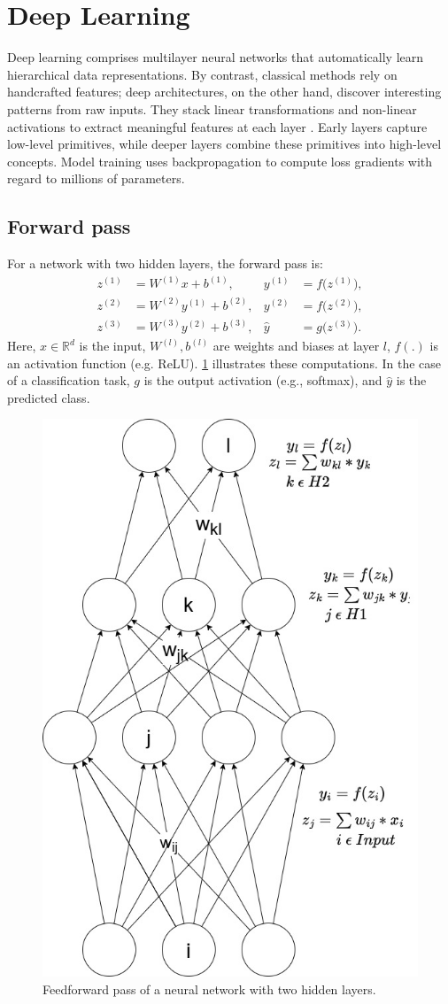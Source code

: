\section{Deep Learning} 
\label{sec:deep_learning}

Deep learning comprises multilayer neural networks that automatically learn hierarchical data representations. By contrast, classical methods rely on handcrafted features; deep architectures, on the other hand, discover interesting patterns from raw inputs. They stack linear transformations and non-linear activations to extract meaningful features at each layer \cite{lecun_deep_learning_2015}. Early layers capture low-level primitives, while deeper layers combine these primitives into high-level concepts. Model training uses backpropagation to compute loss gradients with regard to millions of parameters. 

\subsection{Forward pass}
For a network with two hidden layers, the forward pass is:
\begin{align}
z^{(1)} &= W^{(1)} x + b^{(1)}, & y^{(1)} &= f\bigl(z^{(1)}\bigr), \\
z^{(2)} &= W^{(2)} y^{(1)} + b^{(2)}, & y^{(2)} &= f\bigl(z^{(2)}\bigr), \\
z^{(3)} &= W^{(3)} y^{(2)} + b^{(3)}, & \hat{y} &= g\bigl(z^{(3)}\bigr).
\end{align}
Here, \(x\in\mathbb{R}^d\) is the input, \(W^{(l)},b^{(l)}\) are weights and biases at layer \(l\), \(f(.)\) is an activation function (e.g. ReLU). \cref{fig:forward_pass} illustrates these computations. In the case of a classification task, \(g\) is the output activation (e.g., softmax), and \(\hat{y}\) is the predicted class.

\begin{figure}[ht]
    \centering 
    \includegraphics[width=0.6\linewidth]{figures/neural_net.jpg}
    \caption{Feedforward pass of a neural network with two hidden layers.} 
    \label{fig:forward_pass}
\end{figure}

